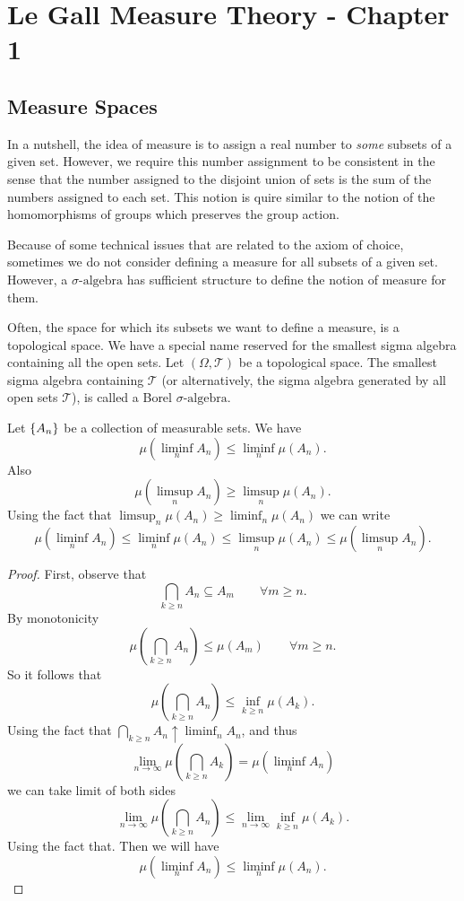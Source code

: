 \chapter{Le Gall Measure Theory - Chapter 1}



\section{Measure Spaces}
In a nutshell, the idea of measure is to assign a real number to \emph{some} subsets of a given set. However, we require this number assignment to be consistent in the sense that the number assigned to the disjoint union of sets is the sum of the numbers assigned to each set. This notion is quire similar to the notion of the homomorphisms of groups which preserves the group action.

\begin{remark}
	Because of some technical issues that are related to the axiom of choice, sometimes we do not consider defining a measure for all subsets of a given set. However, a $\sigma\text{-algebra}$ has sufficient structure to define the notion of measure for them.
\end{remark}


\begin{remark}
	Often, the space for which its subsets we want to define a measure, is a topological space. We have a special name reserved for the smallest sigma algebra containing all the open sets. Let $ (\Omega,\mathcal{T}) $ be a topological space. The smallest sigma algebra containing $ \mathcal{T} $ (or alternatively, the sigma algebra generated by all open sets $ \mathcal{T} $), is called a Borel $\sigma\text{-algebra}$.
\end{remark}




\begin{proposition}
	Let $ \{A_n\} $ be a collection of measurable sets. We have
	\[ \mu(\liminf_n A_n) \leq \liminf_n \mu(A_n). \]
	Also
	\[ \mu(\limsup_n A_n) \geq \limsup_n \mu(A_n). \]
	Using the fact that $ \limsup_n \mu(A_n) \geq \liminf_n \mu(A_n) $ we can write
	\[ \mu(\liminf_n A_n) \leq \liminf_n \mu(A_n) \leq \limsup_n \mu(A_n) \leq \mu(\limsup_n A_n). \]
\end{proposition}
\begin{proof}
	First, observe that
	\[ \bigcap_{k\geq n} A_n \subseteq A_m \qquad \forall m\geq n. \]
	By monotonicity
	\[ \mu(\bigcap_{k\geq n} A_n) \leq \mu (A_m) \qquad \forall m \geq n. \]
	So it follows that 
	\[ \mu(\bigcap_{k\geq n} A_n) \leq \inf_{k\geq n}\mu(A_k).  \]
	Using the fact that $ \bigcap_{k\geq n} A_n \uparrow \liminf_n A_n $, and thus 
	\[\lim_{n\to\infty} \mu(\bigcap_{k\geq n} A_k) = \mu(\liminf_n A_n) \]
	we can take limit of both sides
	\[ \lim_{n\to\infty} \mu(\bigcap_{k\geq n}A_n) \leq \lim_{n\to\infty }\inf_{k\geq n} \mu(A_k). \]
	Using the fact that. Then we will have
	\[ \mu(\liminf_n A_n) \leq \liminf_n \mu(A_n). \]
\end{proof}


